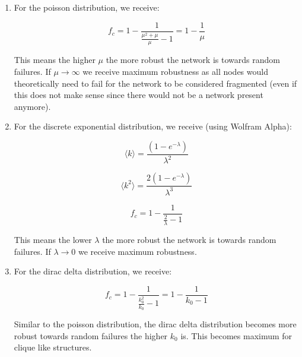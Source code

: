 \begin{enumerate}
	\item For the poisson distribution, we receive:
	
	\begin{equation*}
		f_c = 1 - \frac{1}{\frac{\mu^2 + \mu}{\mu} - 1} = 1 - \frac{1}{\mu}
	\end{equation*}

	This means the higher $\mu$ the more robust the network is towards random failures. If $\mu \rightarrow \infty$ we receive maximum robustness as all nodes would theoretically need to fail for the network to be considered fragmented (even if this does not make sense since there would not be a network present anymore).

	\item For the discrete exponential distribution, we receive (using Wolfram Alpha):

	\begin{equation*}
			\langle k \rangle = \frac{(1 - e^{-\lambda})}{\lambda^2}
	\end{equation*}

	\begin{equation*}
		\langle k^2 \rangle = \frac{2(1 - e^{-\lambda})}{\lambda^3}
	\end{equation*}

	\begin{equation*}
		f_c = 1 - \frac{1}{\frac{2}{\lambda} - 1}
	\end{equation*}

	This means the lower $\lambda$ the more robust the network is towards random failures. If $\lambda \rightarrow 0$ we receive maximum robustness. 

	\item For the dirac delta distribution, we receive:

	\begin{equation*}
		f_c = 1 - \frac{1}{\frac{k_0^2}{k_0} - 1} =  1 - \frac{1}{k_0 - 1}
	\end{equation*}

	Similar to the poisson distribution, the dirac delta distribution becomes more robust towards random failures the higher $k_0$ is. This becomes maximum for clique like structures. 

\end{enumerate}